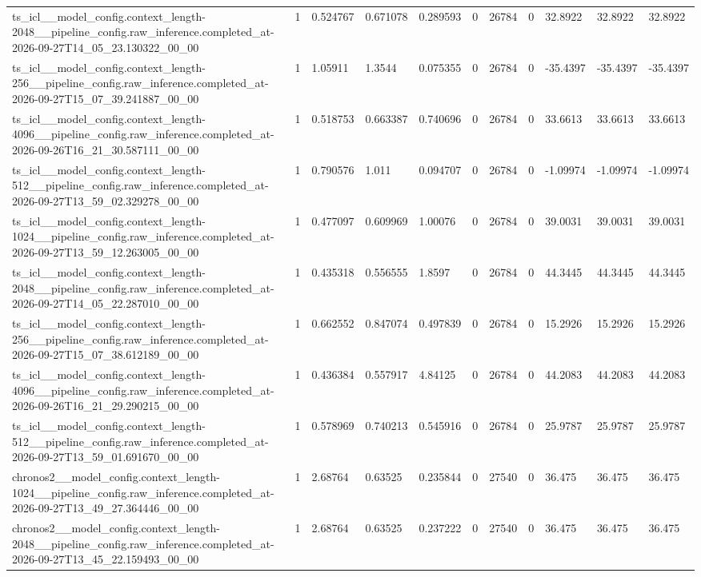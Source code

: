 \begin{tabular}{lllllllllll}
ts\_icl\_\_model\_config.context\_length-2048\_\_pipeline\_config.raw\_inference.completed\_at-2026-09-27T14\_05\_23.130322\_00\_00 & 1 & 0.524767 & 0.671078 & 0.289593 & 0 & 26784 & 0 & 32.8922 & 32.8922 & 32.8922 \\
ts\_icl\_\_model\_config.context\_length-256\_\_pipeline\_config.raw\_inference.completed\_at-2026-09-27T15\_07\_39.241887\_00\_00 & 1 & 1.05911 & 1.3544 & 0.075355 & 0 & 26784 & 0 & -35.4397 & -35.4397 & -35.4397 \\
ts\_icl\_\_model\_config.context\_length-4096\_\_pipeline\_config.raw\_inference.completed\_at-2026-09-26T16\_21\_30.587111\_00\_00 & 1 & 0.518753 & 0.663387 & 0.740696 & 0 & 26784 & 0 & 33.6613 & 33.6613 & 33.6613 \\
ts\_icl\_\_model\_config.context\_length-512\_\_pipeline\_config.raw\_inference.completed\_at-2026-09-27T13\_59\_02.329278\_00\_00 & 1 & 0.790576 & 1.011 & 0.094707 & 0 & 26784 & 0 & -1.09974 & -1.09974 & -1.09974 \\
ts\_icl\_\_model\_config.context\_length-1024\_\_pipeline\_config.raw\_inference.completed\_at-2026-09-27T13\_59\_12.263005\_00\_00 & 1 & 0.477097 & 0.609969 & 1.00076 & 0 & 26784 & 0 & 39.0031 & 39.0031 & 39.0031 \\
ts\_icl\_\_model\_config.context\_length-2048\_\_pipeline\_config.raw\_inference.completed\_at-2026-09-27T14\_05\_22.287010\_00\_00 & 1 & 0.435318 & 0.556555 & 1.8597 & 0 & 26784 & 0 & 44.3445 & 44.3445 & 44.3445 \\
ts\_icl\_\_model\_config.context\_length-256\_\_pipeline\_config.raw\_inference.completed\_at-2026-09-27T15\_07\_38.612189\_00\_00 & 1 & 0.662552 & 0.847074 & 0.497839 & 0 & 26784 & 0 & 15.2926 & 15.2926 & 15.2926 \\
ts\_icl\_\_model\_config.context\_length-4096\_\_pipeline\_config.raw\_inference.completed\_at-2026-09-26T16\_21\_29.290215\_00\_00 & 1 & 0.436384 & 0.557917 & 4.84125 & 0 & 26784 & 0 & 44.2083 & 44.2083 & 44.2083 \\
ts\_icl\_\_model\_config.context\_length-512\_\_pipeline\_config.raw\_inference.completed\_at-2026-09-27T13\_59\_01.691670\_00\_00 & 1 & 0.578969 & 0.740213 & 0.545916 & 0 & 26784 & 0 & 25.9787 & 25.9787 & 25.9787 \\
chronos2\_\_model\_config.context\_length-1024\_\_pipeline\_config.raw\_inference.completed\_at-2026-09-27T13\_49\_27.364446\_00\_00 & 1 & 2.68764 & 0.63525 & 0.235844 & 0 & 27540 & 0 & 36.475 & 36.475 & 36.475 \\
chronos2\_\_model\_config.context\_length-2048\_\_pipeline\_config.raw\_inference.completed\_at-2026-09-27T13\_45\_22.159493\_00\_00 & 1 & 2.68764 & 0.63525 & 0.237222 & 0 & 27540 & 0 & 36.475 & 36.475 & 36.475 \\

\end{tabular}
